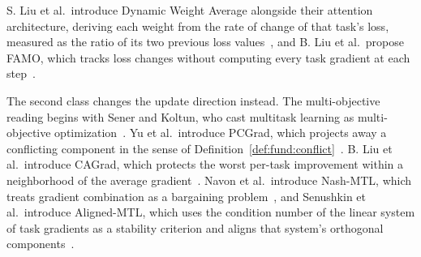 S. Liu et al.\ introduce Dynamic Weight Average alongside their attention
architecture, deriving each weight from the rate of change of that task's loss,
measured as the ratio of its two previous loss values~\cite{liu2019dwa}, and B. Liu et
al.\ propose FAMO, which tracks loss changes without computing every task gradient at
each step~\cite{liu2023famo}.

The second class changes the update direction instead. The multi-objective reading
begins with Sener and Koltun, who cast multitask learning as multi-objective
optimization~\cite{sener2018mgda}. Yu et al.\ introduce PCGrad, which projects away a
conflicting component in the sense of Definition~\ref{def:fund:conflict}~\cite{yu2020pcgrad}.
B. Liu et al.\ introduce CAGrad, which protects the worst per-task improvement within a
neighborhood of the average gradient~\cite{liu2021cagrad}. Navon et al.\ introduce
Nash-MTL, which treats gradient combination as a bargaining problem~\cite{nash}, and
Senushkin et al.\ introduce Aligned-MTL, which uses the condition number of the linear
system of task gradients as a stability criterion and aligns that system's orthogonal
components~\cite{senushkin2023aligned}.

